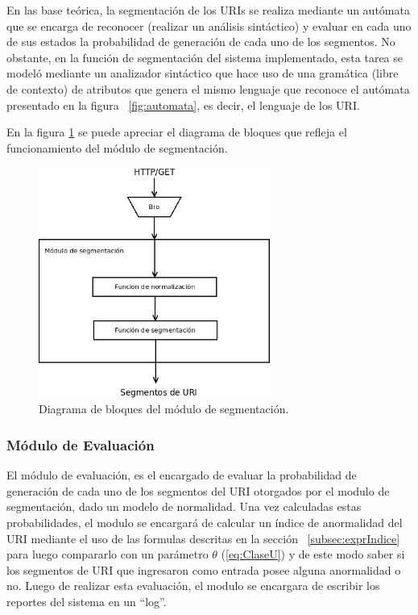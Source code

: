  En las base teórica, la segmentación de los URIs se realiza mediante un autómata que se encarga de reconocer (realizar un análisis sintáctico) y evaluar en cada uno de sus estados la probabilidad de generación de cada uno de los segmentos.  No obstante, en la función de segmentación del sistema implementado, esta tarea se modeló mediante un analizador sintáctico que hace uso de una gramática (libre de contexto) de atributos que genera el mismo lenguaje que reconoce el autómata presentado en la figura ~\ref{fig:automata}, es decir, el lenguaje de los URI.

En la figura \ref{fig:arquiSegmentacion} se puede apreciar el diagrama de bloques que refleja el funcionamiento del módulo de segmentación.

\begin{figure}[!htb]
\begin{center}
\includegraphics[width=3in]{./img/segArquiCompleta.jpeg}
\caption{Diagrama de bloques del módulo de segmentación.}
\label{fig:arquiSegmentacion}
\end{center}
\end{figure}

\subsubsection{Módulo de Evaluación}
\label{sec:evaluacion}

El módulo de evaluación, es el encargado de evaluar la probabilidad de generación de cada uno de los segmentos del URI otorgados por el modulo de segmentación, dado un modelo de normalidad. Una vez calculadas estas probabilidades, el modulo se encargará de calcular un índice de anormalidad del URI mediante el uso de las formulas descritas en la sección ~\ref{subsec:exprIndice} para luego compararlo con un parámetro $\theta$ (\ref{eq:ClaseU}) y de este modo saber si los segmentos de URI que ingresaron como entrada posee alguna anormalidad o no. Luego de realizar esta evaluación, el modulo se encargara de escribir los reportes del sistema en un ``log''.

